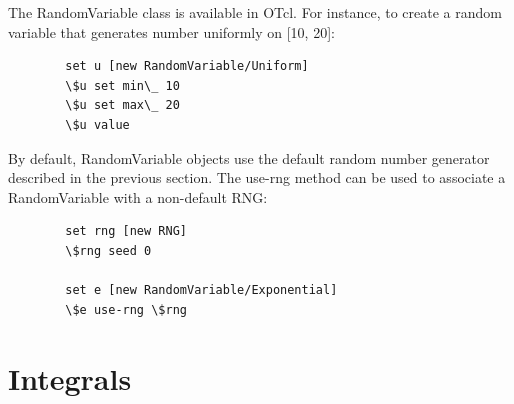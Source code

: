 The RandomVariable class is available in OTcl.  For instance, to
create a random variable that generates number uniformly on [10, 20]:
\begin{verbatim}
        set u [new RandomVariable/Uniform]
        \$u set min\_ 10
        \$u set max\_ 20
        \$u value
\end{verbatim}
By default, RandomVariable objects use the default random number
generator described in the previous section.  The use-rng method can
be used to associate a RandomVariable with a non-default RNG:
\begin{verbatim}
        set rng [new RNG]
        \$rng seed 0

        set e [new RandomVariable/Exponential]
        \$e use-rng \$rng
\end{verbatim}


\section{Integrals}
\label{sec:integral}

